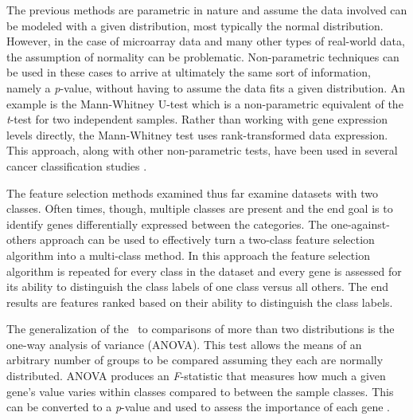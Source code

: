 

The previous methods are parametric in nature and assume the data involved can
be modeled with a given distribution, most typically the normal distribution.
However, in the case of microarray data and many other types of real-world
data, the assumption of normality can be problematic.  Non-parametric
techniques can be used in these cases to arrive at ultimately the same sort of
information, namely a \emph{p}-value, without having to assume the data fits a
given distribution.  An example is the Mann-Whitney U-test which is a
non-parametric equivalent of the \emph{t}-test for two independent samples.
Rather than working with gene expression levels directly, the Mann-Whitney test
uses rank-transformed data expression.  This approach, along with other
non-parametric tests, have been used in several cancer classification studies
\cite{troyanskaya2002nmi,park2001nsa,dettling2002scg}. 



The feature selection methods examined thus far examine datasets with two
classes.  Often times, though, multiple classes are present and the end goal is
to identify genes differentially expressed between the categories.  The
one-against-others approach can be used to effectively turn a two-class feature
selection algorithm into a multi-class method.  In this approach the feature
selection algorithm is repeated for every class in the dataset and every gene
is assessed for its ability to distinguish the class labels of one class versus
all others.  The end results are features ranked based on their ability to
distinguish the class labels.  


The generalization of the \ttest\ to comparisons of more than two distributions
is the one-way analysis of variance (ANOVA).  This test allows the means of an
arbitrary number of groups to be compared assuming they each are normally
distributed.  ANOVA produces an \emph{F}-statistic that measures how much a
given gene's value varies within classes compared to between the sample
classes.  This can be converted to a \emph{p}-value and used to assess the
importance of each gene \cite{cui2003std,kerr2000avg,lee2002mmg,yang2003sma}.

